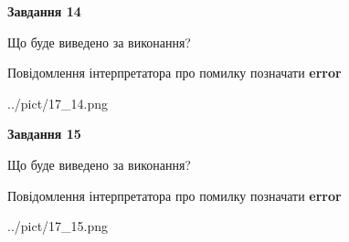 \documentclass[11pt, ukrainian]{article}
\begin{document}
{\begin {large}
{\begin {center}\textbf{Завдання 14}\end {center}}\par
Що буде виведено за виконання? \par
Повідомлення інтерпретатора про помилку позначати \textbf{error}

\begin{center}
	{../pict/17_14.png}
\end{center}
\newpage

{\begin {center}\textbf{Завдання 15}\end {center}}\par
Що буде виведено за виконання? \par
Повідомлення інтерпретатора про помилку позначати \textbf{error}

\begin{center}
	{../pict/17_15.png}
\end{center}
\newpage

\end {large}}
\end{document}
